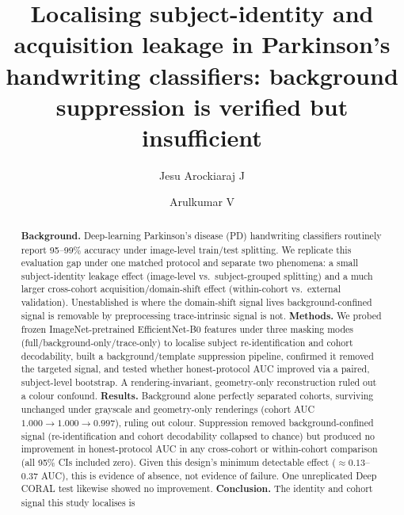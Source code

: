 \documentclass[3p,final,10pt]{elsarticle}
\begin{document}
\begin{frontmatter}

\title{Localising subject-identity and acquisition leakage in Parkinson's
handwriting classifiers: background suppression is verified but
insufficient}

\author[1]{Jesu Arockiaraj J}
\author[1]{Arulkumar V}


\begin{abstract}
\noindent
\textbf{Background.} Deep-learning Parkinson's disease (PD) handwriting
classifiers routinely report 95--99\% accuracy under image-level
train/test splitting. We replicate this evaluation gap under one matched
protocol and separate two phenomena: a small subject-identity leakage
effect (image-level vs.\ subject-grouped splitting) and a much larger
cross-cohort acquisition/domain-shift effect (within-cohort vs.\ external
validation). Unestablished is where the domain-shift signal lives background-confined signal is removable by preprocessing trace-intrinsic
signal is not.
\textbf{Methods.} We probed frozen ImageNet-pretrained EfficientNet-B0
features under three masking modes (full/background-only/trace-only) to
localise subject re-identification and cohort decodability, built a
background/template suppression pipeline, confirmed it removed the
targeted signal, and tested whether honest-protocol AUC improved via a
paired, subject-level bootstrap. A rendering-invariant, geometry-only
reconstruction ruled out a colour confound.
\textbf{Results.} Background alone perfectly separated cohorts, surviving
unchanged under grayscale and geometry-only renderings (cohort AUC
$1.000\to1.000\to0.997$), ruling out colour. Suppression removed
background-confined signal (re-identification and cohort decodability
collapsed to chance) but produced no improvement in honest-protocol AUC in
any cross-cohort or within-cohort comparison (all 95\% CIs included
zero). Given this design's minimum detectable effect
($\approx0.13$--$0.37$ AUC), this is evidence of absence, not evidence of
failure. One unreplicated Deep CORAL test likewise showed no improvement.
\textbf{Conclusion.} The identity and cohort signal this study localises is

\end{abstract}
\end{frontmatter}
\end{document}
